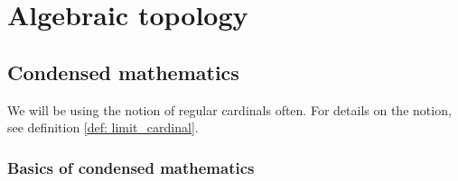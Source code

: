 \chapter{Algebraic topology}
    \begin{abstract}
        
    \end{abstract}
    
    \minitoc
    
    \section{Condensed mathematics} \label{section: condensed_mathematics}
        \begin{remark}
            We will be using the notion of regular cardinals often. For details on the notion, see definition \ref{def: limit_cardinal}.
        \end{remark}
    
        \subsection{Basics of condensed mathematics}
